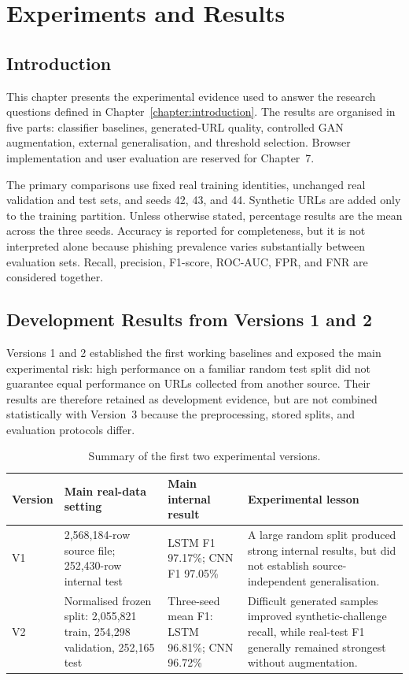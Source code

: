 \chapter{Experiments and Results}
\label{chap:experiments-results}

\section{Introduction}

This chapter presents the experimental evidence used to answer the research
questions defined in Chapter~\ref{chapter:introduction}. The results are organised
in five parts: classifier baselines, generated-URL quality, controlled GAN
augmentation, external generalisation, and threshold selection. Browser
implementation and user evaluation are reserved for Chapter~7.

The primary comparisons use fixed real training identities, unchanged real
validation and test sets, and seeds 42, 43, and 44. Synthetic URLs are added
only to the training partition. Unless otherwise stated, percentage results are
the mean across the three seeds. Accuracy is reported for completeness, but it
is not interpreted alone because phishing prevalence varies substantially
between evaluation sets. Recall, precision, F1-score, ROC-AUC, FPR, and FNR are
considered together.

\section{Development Results from Versions 1 and 2}

Versions 1 and 2 established the first working baselines and exposed the main
experimental risk: high performance on a familiar random test split did not
guarantee equal performance on URLs collected from another source. Their
results are therefore retained as development evidence, but are not combined
statistically with Version~3 because the preprocessing, stored splits, and
evaluation protocols differ.

\begin{table}[htbp]
\centering
\caption{Summary of the first two experimental versions.}
\label{tab:v1-v2-summary}
\small
\begin{tabular}{@{}p{}p{}p{}p{}@{}}
\toprule
Version & Main real-data setting & Main internal result & Experimental lesson \\
\midrule
V1 & 2,568,184-row source file; 252,430-row internal test & LSTM F1 97.17\%; CNN F1 97.05\% & A large random split produced strong internal results, but did not establish source-independent generalisation. \\
V2 & Normalised frozen split: 2,055,821 train, 254,298 validation, 252,165 test & Three-seed mean F1: LSTM 96.81\%; CNN 96.72\% & Difficult generated samples improved synthetic-challenge recall, while real-test F1 generally remained strongest without augmentation. \\
\bottomrule
\end{tabular}
\end{table}

